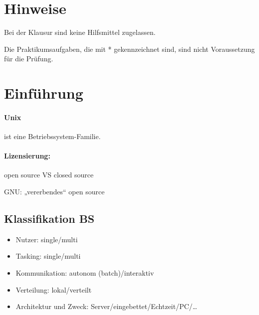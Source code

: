 




\maketitle
\newpage
\tableofcontents
\newpage

\section*{Hinweise}
Bei der Klausur sind keine Hilfsmittel zugelassen.

Die Praktikumsaufgaben, die mit * gekennzeichnet sind, sind nicht Voraussetzung für die Prüfung.

\section{Einführung}

\paragraph{Unix} ist eine Betriebssystem-Familie.

\paragraph{Lizensierung:} open source VS closed source

GNU: „vererbendes“ open source
\subsection{Klassifikation BS}
\begin{itemize}
\item Nutzer: single/multi
\item Tasking: single/multi
\item Kommunikation: autonom (batch)/interaktiv
\item Verteilung: lokal/verteilt
\item Architektur und Zweck: Server/eingebettet/Echtzeit/PC/…
\end{itemize}

